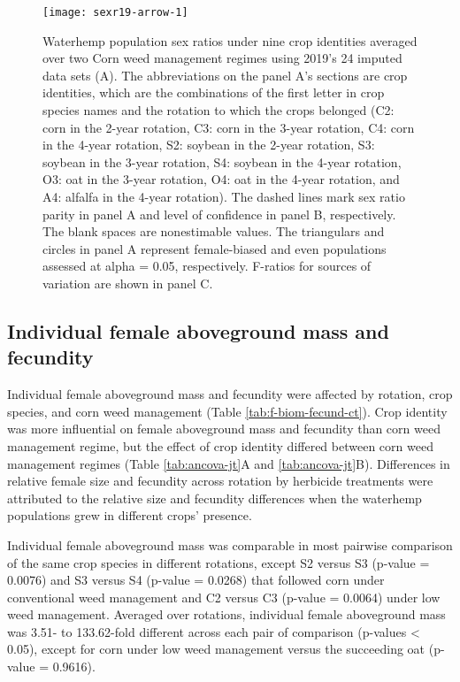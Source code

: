 \documentclass[
]{article}
\begin{document}
\begin{figure}
\texttt{[image: sexr19-arrow-1]} \caption{Waterhemp population sex ratios under nine crop identities averaged over two Corn weed management regimes using 2019's 24 imputed data sets (A). The abbreviations on the panel A's sections are crop identities, which are the combinations of the first letter in crop species names and the rotation to which the crops belonged (C2: corn in the 2-year rotation, C3: corn in the 3-year rotation, C4: corn in the 4-year rotation, S2: soybean in the 2-year rotation, S3: soybean in the 3-year rotation, S4: soybean in the 4-year rotation, O3: oat in the 3-year rotation, O4: oat in the 4-year rotation, and A4: alfalfa in the 4-year rotation). The dashed lines mark sex ratio parity in panel A and level of confidence in panel B, respectively. The blank spaces are nonestimable values. The triangulars and circles in panel A represent female-biased and even populations assessed at alpha = 0.05, respectively. F-ratios for sources of variation are shown in panel C.}\label{fig:sexr19-arrow}
\end{figure}

\hypertarget{individual-female-aboveground-mass-and-fecundity-2}{%
\subsection*{Individual female aboveground mass and fecundity}\label{individual-female-aboveground-mass-and-fecundity-2}}

Individual female aboveground mass and fecundity were affected by rotation, crop species, and corn weed management (Table \ref{tab:f-biom-fecund-ct}). Crop identity was more influential on female aboveground mass and fecundity than corn weed management regime, but the effect of crop identity differed between corn weed management regimes (Table \ref{tab:ancova-jt}A and \ref{tab:ancova-jt}B). Differences in relative female size and fecundity across rotation by herbicide treatments were attributed to the relative size and fecundity differences when the waterhemp populations grew in different crops' presence.

Individual female aboveground mass was comparable in most pairwise comparison of the same crop species in different rotations, except S2 versus S3 (p-value = 0.0076) and S3 versus S4 (p-value = 0.0268) that followed corn under conventional weed management and C2 versus C3 (p-value = 0.0064) under low weed management. Averaged over rotations, individual female aboveground mass was 3.51- to 133.62-fold different across each pair of comparison (p-values \textless{} 0.05), except for corn under low weed management versus the succeeding oat (p-value = 0.9616).
\end{document}
